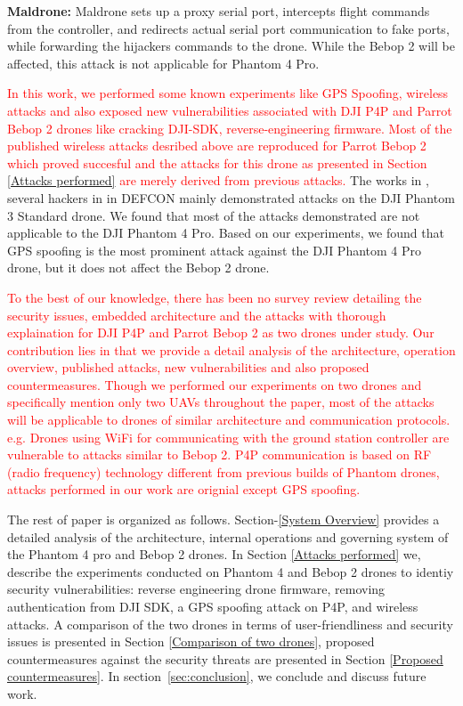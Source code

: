 \documentclass[conference]{IEEEtran}
\begin{document}
\noindent \textbf{Maldrone: }
Maldrone\cite{maldrone} sets up a proxy serial port, intercepts flight commands from the controller, and redirects actual serial port communication to fake ports, while forwarding the hijackers commands to the drone. While the Bebop 2 will be affected, this attack is not applicable for Phantom 4 Pro.


\textcolor{red}{In this work, we performed some known experiments like GPS Spoofing, wireless attacks and also exposed new vulnerabilities associated with DJI P4P and Parrot Bebop 2 drones like cracking DJI-SDK, reverse-engineering firmware. Most of the published wireless attacks desribed above are reproduced for Parrot Bebop 2 which proved succesful and the attacks for this drone as presented in Section \ref{Attacks performed} are merely derived from previous attacks.}
The works in \cite{mit9}, several hackers in \cite{defcon23} in DEFCON mainly demonstrated attacks on the DJI Phantom 3 Standard drone. We found that most of the attacks demonstrated are not applicable to the DJI Phantom 4 Pro. Based on our experiments, we found that GPS spoofing is the most prominent attack against the DJI Phantom 4 Pro drone, but it does not affect the Bebop 2 drone. 

\textcolor{red}{To the best of our knowledge, there has been no survey review detailing the security issues, embedded architecture and the attacks with thorough explaination for DJI P4P and Parrot Bebop 2 as two drones under study. Our contribution lies in that we provide a detail analysis of the architecture, operation overview, published attacks, new vulnerabilities and also proposed countermeasures. Though we performed our experiments on two drones and specifically mention only two UAVs throughout the paper, most of the attacks will be applicable to drones of similar architecture and communication protocols. e.g. Drones using WiFi for communicating with the ground station controller are vulnerable to attacks similar to Bebop 2. P4P communication is based on RF (radio frequency) technology different from previous builds of Phantom drones, attacks performed in our work are orignial except GPS spoofing.}
    
The rest of paper is organized as follows. Section-\ref{System Overview} provides a detailed analysis of the architecture, internal operations and governing system of the Phantom 4 pro and Bebop 2 drones. 
In Section \ref{Attacks performed} we, describe the experiments conducted on 
 Phantom 4 and Bebop 2 drones to identiy security vulnerabilities: reverse engineering drone firmware, removing authentication from DJI SDK, a GPS spoofing attack on P4P, and wireless attacks. 
A comparison of the  two drones in terms of user-friendliness and security issues is presented in Section \ref{Comparison of two drones}, proposed countermeasures against the security threats are presented in Section \ref{Proposed countermeasures}. In section~\ref{sec:conclusion}, we conclude and discuss future work. 
\end{document}
